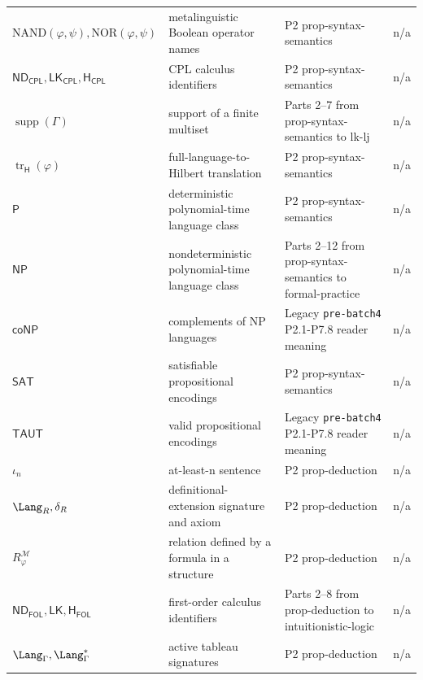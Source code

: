 \begin{longtable}{@{}p{}p{}p{}p{}@{}}
\(\mathrm{NAND}(\varphi,\allowbreak \psi),\allowbreak \mathrm{NOR}(\varphi,\allowbreak \psi)\) & metalinguistic Boolean operator names & P2 prop-\allowbreak{}syntax-\allowbreak{}semantics & n/a \\
\(\mathsf{ND}_{\mathsf{CPL}},\allowbreak \mathsf{LK}_{\mathsf{CPL}},\allowbreak \mathsf H_{\mathsf{CPL}}\) & CPL calculus identifiers & P2 prop-\allowbreak{}syntax-\allowbreak{}semantics & n/a \\
\(\operatorname{supp}(\Gamma)\) & support of a finite multiset & Parts 2--7 from prop-\allowbreak{}syntax-\allowbreak{}semantics to lk-\allowbreak{}lj & n/a \\
\(\operatorname{tr}_{\mathsf H}(\varphi)\) & full-language-to-Hilbert translation & P2 prop-\allowbreak{}syntax-\allowbreak{}semantics & n/a \\
\(\mathsf P\) & deterministic polynomial-time language class & P2 prop-\allowbreak{}syntax-\allowbreak{}semantics & n/a \\
\(\mathsf{NP}\) & nondeterministic polynomial-time language class & Parts 2--12 from prop-\allowbreak{}syntax-\allowbreak{}semantics to formal-\allowbreak{}practice & n/a \\
\(\mathsf{coNP}\) & complements of NP languages & Legacy \texttt{pre-\allowbreak{}batch4} P2.\allowbreak{}1-\allowbreak{}P7.\allowbreak{}8 reader meaning & n/a \\
\(\mathsf{SAT}\) & satisfiable propositional encodings & P2 prop-\allowbreak{}syntax-\allowbreak{}semantics & n/a \\
\(\mathsf{TAUT}\) & valid propositional encodings & Legacy \texttt{pre-\allowbreak{}batch4} P2.\allowbreak{}1-\allowbreak{}P7.\allowbreak{}8 reader meaning & n/a \\
\(\iota_n\) & at-least-n sentence & P2 prop-\allowbreak{}deduction & n/a \\
\(\Lang_R,\allowbreak \delta_R\) & definitional-extension signature and axiom & P2 prop-\allowbreak{}deduction & n/a \\
\(R^{\mathcal M}_{\varphi}\) & relation defined by a formula in a structure & P2 prop-\allowbreak{}deduction & n/a \\
\(\mathsf{ND}_{\mathsf{FOL}},\allowbreak \mathsf{LK},\allowbreak \mathsf H_{\mathsf{FOL}}\) & first-order calculus identifiers & Parts 2--8 from prop-\allowbreak{}deduction to intuitionistic-\allowbreak{}logic & n/a \\
\(\Lang_{\Gamma},\allowbreak \Lang_{\Gamma}^{*}\) & active tableau signatures & P2 prop-\allowbreak{}deduction & n/a \\

\end{longtable}
